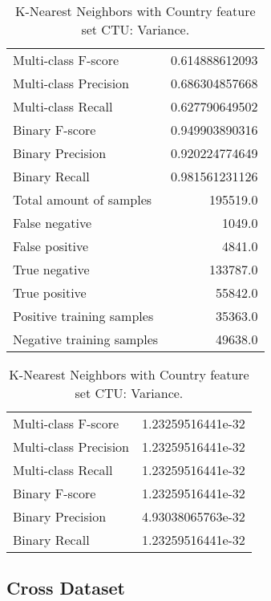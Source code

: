 \begin{table}[H]
\begin{minipage}{0.5\textwidth}
\caption{K-Nearest Neighbors with Country feature set CTU: Average.}
\centering
\begin{tabular}{l r}
\toprule
Multi-class F-score & 0.614888612093 \\
Multi-class Precision & 0.686304857668 \\
Multi-class Recall & 0.627790649502 \\
\midrule
Binary F-score & 0.949903890316 \\
Binary Precision & 0.920224774649 \\
Binary Recall & 0.981561231126 \\
\midrule
Total amount of samples & 195519.0 \\
False negative & 1049.0 \\
False positive & 4841.0 \\
True negative & 133787.0 \\
True positive & 55842.0 \\
\midrule
Positive training samples & 35363.0 \\
Negative training samples & 49638.0 \\
\bottomrule
\end{tabular}
\end{minipage}
\hfillx
\begin{minipage}{0.5\textwidth}
\caption{K-Nearest Neighbors with Country feature set CTU: Variance.}
\centering
\begin{tabular}{l r}
\toprule
Multi-class F-score & 1.23259516441e-32 \\
Multi-class Precision & 1.23259516441e-32 \\
Multi-class Recall & 1.23259516441e-32 \\
\midrule
Binary F-score & 1.23259516441e-32 \\
Binary Precision & 4.93038065763e-32 \\
Binary Recall & 1.23259516441e-32 \\
\bottomrule
\end{tabular}
\end{minipage}
\end{table}

\newpage
\subsection{Cross Dataset}

